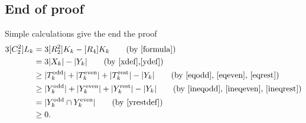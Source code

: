 \documentclass[submission]{FPSAC2021}
\DeclareMathOperator{\odd}{odd}
\DeclareMathOperator{\even}{even}
\DeclareMathOperator{\rest}{rest}
\begin{document}
\subsection{End of proof}
Simple calculations give the end the proof
\begin{align*}
3[C_2^2]L_k & =3[R_2^2]K_k-[R_4]K_k \tag{by \ref{formula}}\\ 
& =3|X_k|-|Y_k| \tag{by \ref{xdef},\ref{ydef}}\\ 
& \geq |T_k^{\odd}|+|T_k^{\even}|+|T_k^{\rest}|-|Y_k| \tag{by \ref{eqodd},
\ref{eqeven}, \ref{eqrest}}\\ & \geq |Y_k^{\odd}|+|Y_k^{\even}|+|
Y_k^{\rest}|-|Y_k| \tag{by \ref{ineqodd}, \ref{ineqeven}, \ref{ineqrest}}\\
& =|Y_k^{\odd} \cap Y_k^{\even}| \tag{by \ref{yrestdef}}\\ 
& \geq 0.
\end{align*}
\printbibliography 
\end{document}
